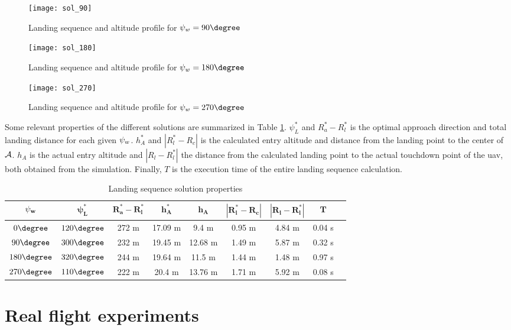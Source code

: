 \begin{figure}[H]
    \texttt{[image: sol\_90]}
    \caption{Landing sequence and altitude profile for $\winddir=90\degree$}
\end{figure}

\begin{figure}[H]
    \texttt{[image: sol\_180]}
    \caption{Landing sequence and altitude profile for $\winddir=180\degree$}
\end{figure}

\begin{figure}[H]
    \texttt{[image: sol\_270]}
    \caption{Landing sequence and altitude profile for $\winddir=270\degree$}
    \label{fig:sim_sol_270}
\end{figure}


Some relevant properties of the different solutions are summarized in Table \ref{tab:opt_land_param}. $\psi_L^*$ and $R_a^*-R_l^*$ is the optimal approach direction and total landing distance for each given $\psi_w$. $h_A^*$ and $|R_l^*-R_c|$ is the calculated entry altitude and distance from the landing point to the center of $\mathcal{A}$. 
$h_A$ is the actual entry altitude and $|R_l-R_l^*|$ the distance from the calculated landing point to the actual touchdown point of the \ac{uav}, both obtained from the simulation. Finally, $T$ is the
execution time of the entire landing sequence calculation.

\begin{table}[H]
    \begin{center}
        \begin{tabular}{|c|c|c|c|c|c|c|c|c|}
            \hline
            $\mathbf{\psi_w}$ & $\mathbf{\psi_L^*}$ & $\mathbf{R_a^*-R_l^*}$ & $\mathbf{h_A^*}$ & $\mathbf{h_A}$ & $\mathbf{|R_l^*-R_c|}$ & $\mathbf{|R_l-R_l^*|}$ & $\mathbf{T}$\\
            \hline
            $0\degree$ & $120\degree$ & 272 m & 17.09 m & 9.4 m & 0.95 m & 4.84 m & 0.04 s \\
            \hline
            $90\degree$ & $300\degree$ & 232 m & 19.45 m & 12.68 m & 1.49 m & 5.87 m & 0.32 s \\
            \hline
            $180\degree$ & $320\degree$ & 244 m & 19.64 m & 11.5 m & 1.44 m & 1.48 m & 0.97 s \\
            \hline
            $270\degree$ & $110\degree$ & 222 m & 20.4 m & 13.76 m & 1.71 m & 5.92 m & 0.08 s \\
            \hline
        \end{tabular}
    \end{center}
    \caption{Landing sequence solution properties}
    \label{tab:opt_land_param}
\end{table}

\section{Real flight experiments}